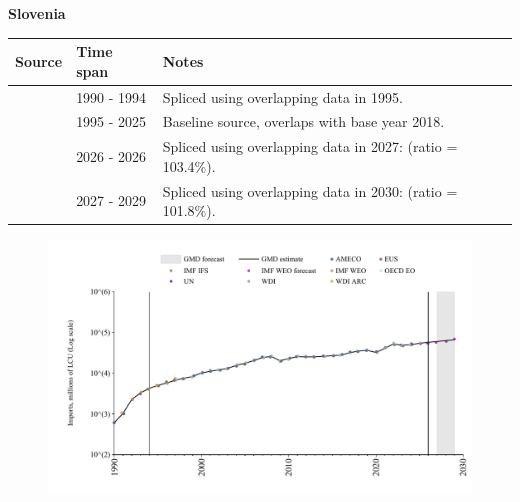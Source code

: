 \documentclass[12pt,a4paper,landscape]{article}
\begin{document}
\begin{adjustbox}{max totalsize={\paperwidth}{\paperheight},center}
\begin{minipage}[t][\textheight][t]{\textwidth}
\vspace*{0.5cm}
{}
\begin{center}
{\Large\bfseries Slovenia}
\end{center}
\vspace{0.5cm}
\begin{table}[H]
\centering
\small
\begin{tabular}{|l|l|l|}
\hline
\textbf{Source} & \textbf{Time span} & \textbf{Notes} \\
\hline
\rowcolor{white}\cite{AMECO}& 1990 - 1994 &Spliced using overlapping data in 1995.\\
\rowcolor{lightgray}\cite{OECD_EO}& 1995 - 2025 &Baseline source, overlaps with base year 2018.\\
\rowcolor{white}\cite{AMECO}& 2026 - 2026 &Spliced using overlapping data in 2027: (ratio = 103.4\%).\\
\rowcolor{lightgray}\cite{IMF_WEO_forecast}& 2027 - 2029 &Spliced using overlapping data in 2030: (ratio = 101.8\%).\\
\hline
\end{tabular}
\end{table}
\begin{figure}[H]
\centering
\includegraphics[width=\textwidth,height=0.6\textheight,keepaspectratio]{graphs/SVN_imports.pdf}
\end{figure}
\end{minipage}
\end{adjustbox}
\end{document}
